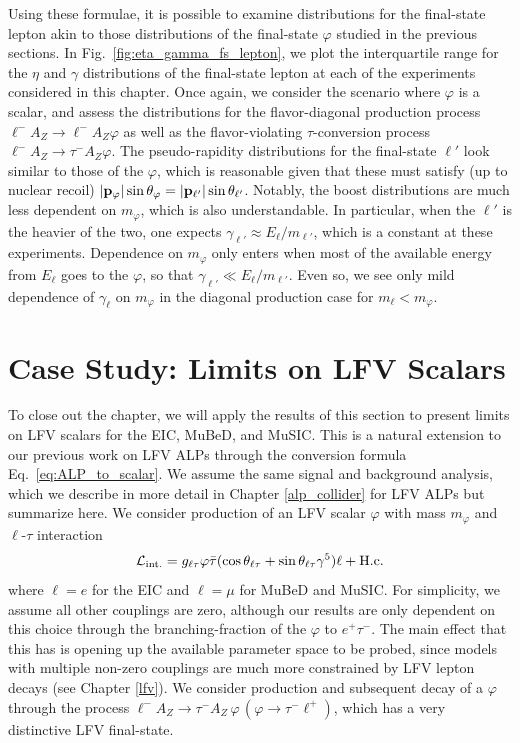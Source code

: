 Using these formulae, it is possible to examine distributions for the final-state lepton akin to those distributions of the final-state $\varphi$ studied in the previous sections. In Fig.~\ref{fig:eta_gamma_fs_lepton}, we plot the interquartile range for the $\eta$ and $\gamma$ distributions of the final-state lepton at each of the experiments considered in this chapter. Once again, we consider the scenario where $\varphi$ is a scalar, and assess the distributions for the flavor-diagonal production process $\ell^- A_Z \rightarrow \ell^- A_Z \varphi$ as well as the flavor-violating $\tau$-conversion process $\ell^- A_Z \rightarrow \tau^- A_Z \varphi$. The pseudo-rapidity distributions for the final-state $\ell'$ look similar to those of the $\varphi$, which is reasonable given that these must satisfy (up to nuclear recoil) $|{\bf p}_\varphi|\sin{\theta_\varphi} = |{\bf p}_{\ell'}|\sin{\theta_{\ell'}}$. Notably, the boost distributions are much less dependent on $m_\varphi$, which is also understandable. In particular, when the $\ell'$ is the heavier of the two, one expects $\gamma_{\ell'} \approx E_\ell/m_{\ell'}$, which is a constant at these experiments. Dependence on $m_\varphi$ only enters when most of the available energy from $E_\ell$ goes to the $\varphi$, so that $\gamma_{\ell'} \ll E_\ell/m_{\ell'}$. Even so, we see only mild dependence of $\gamma_{\ell}$ on $m_\varphi$ in the diagonal production case for $m_{\ell} < m_\varphi$.

\section{Case Study: Limits on LFV Scalars}\label{sec:lfv_scalar_case_study}


To close out the chapter, we will apply the results of this section to present limits on LFV scalars for the EIC, MuBeD, and MuSIC. This is a natural extension to our previous work on LFV ALPs \cite{Davoudiasl:2021mjy, Davoudiasl:2024fiz,Batell:2024cdl} through the conversion formula Eq.~\ref{eq:ALP_to_scalar}. We assume the same signal and background analysis, which we describe in more detail in Chapter \ref{alp_collider} for LFV ALPs but summarize here. We consider production of an LFV scalar $\varphi$ with mass $m_\varphi$ and $\ell$-$\tau$ interaction 
\begin{align}
    {\cal L}_{\rm int.} = g_{\ell\tau}\varphi\bar{\tau}(\cos{\theta_{\ell\tau}} + \sin{\theta_{\ell\tau}}\gamma^5)\ell + {\rm H.c.}
\end{align}
where $\ell = e$ for the EIC and $\ell = \mu$ for MuBeD and MuSIC. For simplicity, we assume all other couplings are zero, although our results are only dependent on this choice through the branching-fraction of the $\varphi$ to $e^+\tau^-$. The main effect that this has is opening up the available parameter space to be probed, since models with multiple non-zero couplings are much more constrained by LFV lepton decays (see Chapter \ref{lfv}). We consider production and subsequent decay of a $\varphi$ through the process $\ell^- A_Z \rightarrow \tau^-A_Z \,\varphi\,(\varphi\rightarrow \tau^- \ell^+)$, which has a very distinctive LFV final-state.


